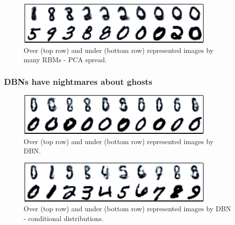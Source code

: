 \documentclass{article}
\begin{document}

\begin{figure}[ht]
\centering
\includegraphics[width=0.98\columnwidth]{figures/many_rbm_over_under_pca}
\caption{
Over (top row) and under (bottom row) represented images by many RBMs - PCA spread.
}
\label{fig:many_rbm_over_under_pca}
\end{figure}


\subsubsection{DBNs have nightmares about ghosts}



\begin{figure}[ht]
\centering
\includegraphics[width=0.98\columnwidth]{figures/dbn_over_under}
\caption{
Over (top row) and under (bottom row) represented images by DBN.
}
\label{fig:dbn_over_under}
\end{figure}

\begin{figure}[ht]
\centering
\includegraphics[width=0.98\columnwidth]{figures/dbn_over_under_digit}
\caption{
Over (top row) and under (bottom row) represented images by DBN - conditional distributions.
}
\label{fig:dbn_over_under_digit}
\end{figure}
\end{document}
